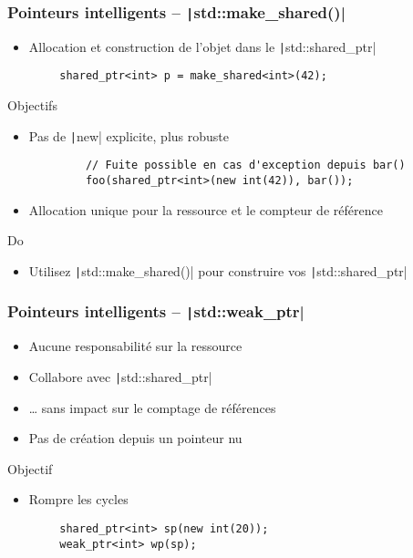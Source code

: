 \documentclass[C++.tex]{subfiles}
\begin{document}
\begin{frame}[fragile]
	\frametitle{Pointeurs intelligents -- \texttt|std::make_shared()|}
	\begin{itemize}
		\item Allocation et construction de l'objet dans le \texttt|std::shared_ptr|
	\end{itemize}

	\begin{verbatim}
		shared_ptr<int> p = make_shared<int>(42);
	\end{verbatim}

	\begin{block}{Objectifs}
		\begin{itemize}
			\item Pas de \texttt|new| explicite, plus robuste
		\end{itemize}

		\begin{verbatim}
			// Fuite possible en cas d'exception depuis bar()
			foo(shared_ptr<int>(new int(42)), bar());
		\end{verbatim}

		\begin{itemize}
			\item Allocation unique pour la ressource et le compteur de référence
		\end{itemize}
	\end{block}

	\begin{exampleblock}{Do}
		\begin{itemize}
			\item Utilisez \texttt|std::make_shared()| pour construire vos \texttt|std::shared_ptr|
		\end{itemize}
	\end{exampleblock}
\end{frame}

\begin{frame}[fragile]
	\frametitle{Pointeurs intelligents -- \texttt|std::weak_ptr|}
	\begin{itemize}
		\item Aucune responsabilité sur la ressource
		\item Collabore avec \texttt|std::shared_ptr|
		\item \ldots{} sans impact sur le comptage de références
		\item Pas de création depuis un pointeur nu
	\end{itemize}

	\begin{block}{Objectif}
		\begin{itemize}
			\item Rompre les cycles 
		\end{itemize}
	\end{block}

	\begin{verbatim}
		shared_ptr<int> sp(new int(20));
		weak_ptr<int> wp(sp);
	\end{verbatim}
\end{frame}
\end{document}
